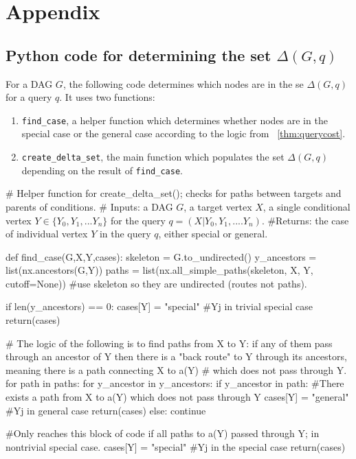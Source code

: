 \chapter*{Appendix}

\section*{Python code for determining the set $\Delta(G,q)$}

For a DAG $G$, the following code determines which nodes are in the se $\Delta(G,q)$ for a query $q$. It uses two functions:
\begin{enumerate}
\item \texttt{find\_case}, a helper function which determines whether nodes are in the special case or the general case according to the logic from ~\cref{thm:querycost}.
\item \texttt{create\_delta\_set}, the main function which populates the set $\Delta(G,q)$ depending on the result of \texttt{find\_case}.
\end{enumerate}


\begin{python}

# Helper function for create_delta_set(); checks for paths between targets and parents of conditions.
# Inputs: a DAG $G$, a target vertex $X$, a single conditional vertex $Y \in \{Y_{0},Y_{1},...Y_{n}\}$ for the query $q = (X|Y_{0},Y_{1},....Y_{n})$.
#Returns: the case of individual vertex $Y$ in the query $q$, either special or general.

def find_case(G,X,Y,cases):
    skeleton = G.to_undirected()
    y_ancestors = list(nx.ancestors(G,Y))
    paths = list(nx.all_simple_paths(skeleton, X, Y, cutoff=None)) #use skeleton so they are undirected (routes not paths).

    if len(y_ancestors) == 0:
        cases[Y] = "special" #Yj in trivial special case
        return(cases)

    # The logic of the following is to find paths from X to Y: if any of them pass through an ancestor of Y then there is a "back route" to Y through its ancestors, meaning there is a path connecting X to a(Y)
    # which does not pass through Y. 
    for path in paths:
        for y_ancestor in y_ancestors:
            if y_ancestor in path: #There exists a path from X to a(Y) which does not pass through Y
                cases[Y] = "general" #Yj in general case 
                return(cases)
            else:
                continue
            
    #Only reaches this block of code if all paths to a(Y) passed through Y; in nontrivial special case.
    cases[Y] = "special" #Yj in the special case
    return(cases)	
    
\end{python}
    
